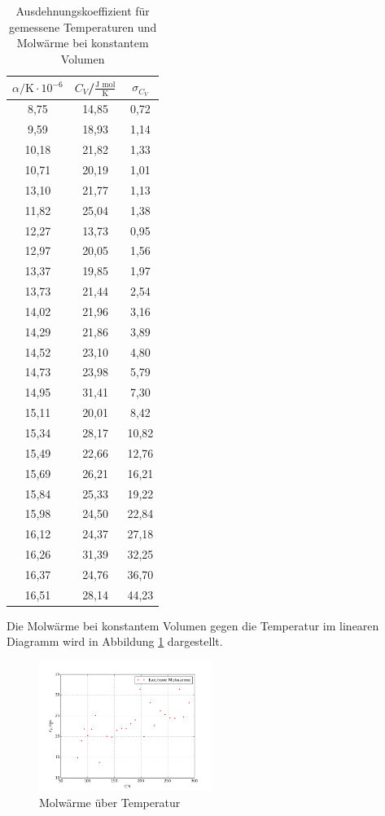 \begin{table}[H]
	\begin{center}
		\begin{tabular}{c c c}
			\toprule
			\(\alpha/\text{K}\cdot10^{-6}\) & \(C_V\)/\(\frac{\text{J mol}}{\text{K}}\) & \(\sigma_{C_V}\) \\
			\midrule
			8,75		&14,85	&0,72\\
			9,59		&18,93	&1,14\\
			10,18	&21,82	&1,33\\
			10,71	&20,19	&1,01\\
			13,10	&21,77	&1,13\\
			11,82	&25,04	&1,38\\
			12,27	&13,73	&0,95\\
			12,97	&20,05	&1,56\\
			13,37	&19,85	&1,97\\
			13,73	&21,44	&2,54\\
			14,02	&21,96	&3,16\\
			14,29	&21,86	&3,89\\
			14,52	&23,10	&4,80\\
			14,73	&23,98	&5,79\\
			14,95	&31,41	&7,30\\
			15,11	&20,01	&8,42\\
			15,34	&28,17	&10,82\\
			15,49	&22,66	&12,76\\
			15,69	&26,21	&16,21\\
			15,84	&25,33	&19,22\\
			15,98	&24,50	&22,84\\
			16,12	&24,37	&27,18\\
			16,26	&31,39	&32,25\\
			16,37	&24,76	&36,70\\
			16,51	&28,14	&44,23\\
			\bottomrule
		\end{tabular}
		\caption{Ausdehnungskoeffizient für gemessene Temperaturen und Molwärme bei konstantem Volumen}
		\label{fig:tab3}
	\end{center}
\end{table}

\noindent Die Molwärme bei konstantem Volumen gegen die Temperatur im linearen Diagramm wird in Abbildung \ref{fig:abb2} dargestellt.

\begin{figure}
	\centering
		\includegraphics[width=0.5\textwidth]{cv.png}
	\caption{Molwärme über Temperatur}
	\label{fig:abb2}
\end{figure}

